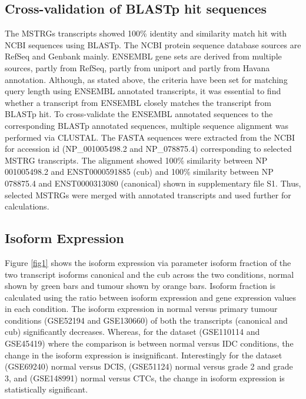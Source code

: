 \documentclass[fleqn,10pt,lineno]{wlpeerj}
\begin{document}
\subsection*{Cross-validation of BLASTp hit sequences}
The MSTRGs transcripts showed 100\% identity and similarity match hit with NCBI sequences using BLASTp. The NCBI protein sequence database sources are RefSeq and Genbank mainly. ENSEMBL gene sets are derived from multiple sources, partly from RefSeq, partly from uniport and partly from Havana annotation. Although, as stated above, the criteria have been set for matching query length using ENSEMBL annotated transcripts, it was essential to find whether a transcript from ENSEMBL closely matches the transcript from BLASTp hit. To cross-validate the ENSEMBL annotated sequences to the corresponding BLASTp annotated sequences, multiple sequence alignment was performed via CLUSTAL. The FASTA sequences were extracted from the NCBI for accession id (NP\_001005498.2 and NP\_078875.4) corresponding to selected MSTRG transcripts. The alignment showed 100\% similarity between NP 001005498.2 and ENST0000591885 (cub) and 100\% similarity between NP 078875.4 and ENST0000313080 (canonical) shown in supplementary file S1. Thus, selected MSTRGs were merged with annotated transcripts and used further for calculations. 
 
\subsection*{Isoform Expression}
Figure \ref{fig1} shows the isoform expression via parameter isoform fraction of the two transcript isoforms canonical and the cub across the two conditions, normal shown by green bars and tumour shown by orange bars. Isoform fraction is calculated using the ratio between isoform expression and gene expression values in each condition. The isoform expression in normal versus primary tumour conditions (GSE52194 and GSE130660) of both the transcripts (canonical and cub) significantly decreases. Whereas, for the dataset (GSE110114 and GSE45419) where the comparison is between normal versus IDC conditions, the change in the isoform expression is insignificant. Interestingly for the dataset (GSE69240) normal versus DCIS, (GSE51124) normal versus grade 2 and grade 3, and (GSE148991) normal versus CTCs, the change in isoform expression is statistically significant.
\end{document}
